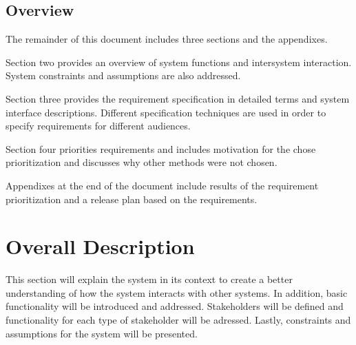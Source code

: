 \documentclass[compsoc,draftclsnofoot,onecolumn,10pt]{IEEEtran}
\begin{document}




\subsection{Overview} %
The remainder of this document includes three sections and the appendixes. \par
Section two provides an overview of system functions and intersystem interaction. 
System constraints and assumptions are also addressed. \par
Section three provides the requirement specification in detailed terms and system interface descriptions. Different specification techniques are used in order to specify requirements for different audiences. \par
Section four priorities requirements and includes motivation for the chose prioritization and discusses why other methods were not chosen. \par
Appendixes at the end of the document include results of the requirement prioritization and a release plan based on the requirements. \cite{IEEE830}

\section{Overall Description} %
This section will explain the system in its context to create a better understanding of how the system interacts with other systems.
In addition, basic functionality will be introduced and addressed. 
Stakeholders will be defined and functionality for each type of stakeholder will be adressed. 
Lastly, constraints and assumptions for the system will be presented. 

\end{document}

